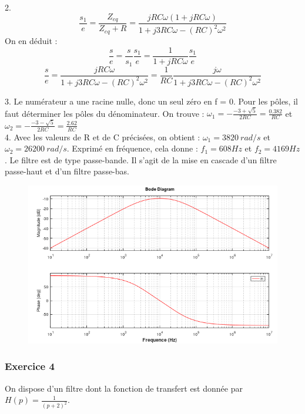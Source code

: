 \documentclass[11pt]{report}
\begin{document}
	2. \begin{equation*}
	\frac{s_1}{e}=\frac{Z_{eq}}{Z_{eq}+R}=\frac{jRC\omega(1+jRC\omega)}{1+j3RC\omega-(RC)^2\omega^2}
	\end{equation*}
	On en déduit :
	\begin{equation*}
	\frac{s}{e}=\frac{s}{s_1}\frac{s_1}{e}=\frac{1}{1+jRC\omega}\frac{s_1}{e}
	\end{equation*}
	\begin{equation*}
	\frac{s}{e}=\frac{jRC\omega}{1+j3RC\omega-(RC)^2\omega^2}=\frac{1}{RC}\frac{j\omega}{1+j3RC\omega-(RC)^2\omega^2}
	\end{equation*}
	
	3. Le numérateur a une racine nulle, donc un seul zéro en f = 0. Pour les pôles, il faut déterminer les pôles du dénominateur. On trouve : $\omega_{1} = -\frac{-3+\sqrt{5}}{2RC}=\frac{0.382}{RC}$ et $\omega_{2} = -\frac{-3-\sqrt{5}}{2RC}=\frac{2.62}{RC}$\\
	
	4. Avec les valeurs de R et de C précisées, on obtient : $\omega_{1} = 3820~rad/s$ et $\omega_{2} = 26200~rad/s$. Exprimé en fréquence, cela donne : $f_1 = 608 Hz$ et $f_2=4169 Hz$. Le filtre est de type passe-bande. Il s'agit de la mise en cascade d'un filtre passe-haut et d'un filtre passe-bas.
	
	\begin{figure}[h!]
		\centering
		\includegraphics[scale=0.7]{images/Exo_4_3_Bode.png} 
	\end{figure}

	
	\subsubsection{Exercice 4}
	On dispose d'un filtre dont la fonction de transfert est donnée par $H(p)=\frac{1}{(p+2)^2}$.
	
\end{document}

